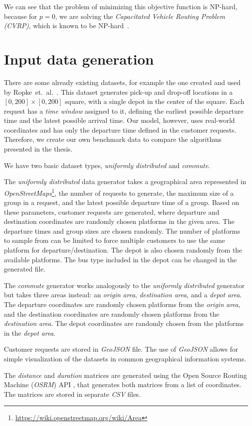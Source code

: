 We can see that the problem of minimizing this objective function is NP-hard, because for $p = 0$, we are solving the \textit{Capacitated Vehicle Routing Problem (CVRP)}, which is known to be NP-hard~\cite{vrpnphard}.

\section{Input data generation} \label{sec:datageneration}

There are some already existing datasets, for example the one created and used by Ropke~et.~al.~\cite{ropkebenchmark}. This dataset generates pick-up and drop-off locations in a $[0, 200] \times [0, 200]$ square, with a single depot in the center of the square. Each request has a \textit{time window} assigned to it, defining the earliest possible departure time and the latest possible arrival time. Our model, however, uses real-world coordinates and has only the departure time defined in the customer requests. Therefore, we create our own benchmark data to compare the algorithms presented in the thesis.

We have two basic dataset types, \textit{uniformly distributed} and \textit{commute}.

The \textit{uniformly distributed} data generator takes a geographical area represented in \textit{OpenStreetMaps}\footnote{\url{https://wiki.openstreetmap.org/wiki/Area}}, the number of requests to generate, the maximum size of a group in a request, and the latest possible departure time of a group. Based on these parameters, customer requests are generated, where departure and destination coordinates are randomly chosen platforms in the given area. The departure times and group sizes are chosen randomly. The number of platforms to sample from can be limited to force multiple customers to use the same platform for departure/destination. The depot is also chosen randomly from the available platforms. The bus type included in the depot can be changed in the generated file.

The \textit{commute} generator works analogously to the \textit{uniformly distributed} generator but takes three areas instead: an \textit{origin area}, \textit{destination area}, and a \textit{depot area}. The departure coordinates are randomly chosen platforms from the \textit{origin area}, and the destination coordinates are randomly chosen platforms from the \textit{destination area}. The depot coordinates are randomly chosen from the platforms in the \textit{depot area}.

Customer requests are stored in \textit{GeoJSON} file. The use of \textit{GeoJSON} allows for simple visualization of the datasets in common geographical information systems.

The \textit{distance} and \textit{duration} matrices are generated using the Open Source Routing Machine (\textit{OSRM}) API \cite{luxen-vetter-2011}, that generates both matrices from a list of coordinates. The matrices are stored in separate \textit{CSV} files.